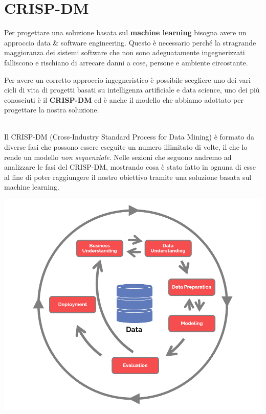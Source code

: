\documentclass[a4paper, 11pt, oneside]{report}
\begin{document}
            \section{CRISP-DM}
            Per progettare una soluzione basata sul \textbf{machine learning} bisogna avere un approccio data \& software
            engineering.
            Questo è necessario perché la stragrande maggioranza dei sistemi software che non sono adeguatamente ingegnerizzati
            falliscono e rischiano di arrecare danni a cose, persone e ambiente circostante.
            \par \noindent Per avere un corretto approccio ingegneristico è possibile scegliere uno dei vari cicli di vita
            di progetti basati su intelligenza artificiale e data science, uno dei più conosciuti è il \textbf{CRISP-DM} ed è anche
            il modello che abbiamo adottato per progettare la nostra soluzione.
            \par \noindent
            \\ \noindent Il CRISP-DM (Cross-Industry Standard Process for Data Mining) è formato da diverse fasi che possono
            essere eseguite un numero illimitato di volte, il che lo rende un modello \textit{non sequenziale}.
            Nelle sezioni che seguono andremo ad analizzare le fasi del CRISP-DM, mostrando cosa è stato fatto in ognuna di esse
            al fine di poter raggiungere il nostro obiettivo tramite una soluzione basata sul machine learning.
            \par \noindent
            \begin{center}
                \includegraphics[scale=0.3]{CRISP-DM}
            \end{center}
\end{document}
